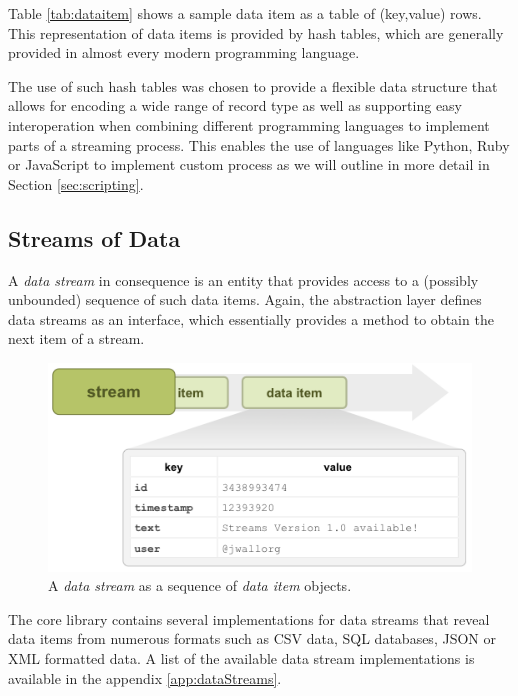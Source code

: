 Table \ref{tab:dataitem} shows a sample data item as a table of
(key,value) rows. This representation of data items is provided
by hash tables, which are generally provided in almost every modern
programming language.

The use of such hash tables was chosen to provide a flexible data
structure that allows for encoding a wide range of record type as well
as supporting easy interoperation when combining different programming
languages to implement parts of a streaming process. This enables the
use of languages like Python, Ruby or JavaScript to implement custom
process as we will outline in more detail in Section
\ref{sec:scripting}.

\subsection*{Streams of Data}
A {\em data stream} in consequence is an entity that provides access
to a (possibly unbounded) sequence of such data items. Again, the
\streams abstraction layer defines data streams as an interface, which
essentially provides a method to obtain the next item of a stream.

\begin{figure}[h1]
  \begin{center}
    \includegraphics[scale=0.5]{graphics/stream-items.png}
  \end{center}
  \caption{\label{fig:datastream}A {\em data stream} as a sequence of {\em data item} objects.}
\end{figure}

The core \streams library contains several implementations for data
streams that reveal data items from numerous formats such as CSV data,
SQL databases, JSON or XML formatted data. A list of the available
data stream implementations is available in the appendix \ref{app:dataStreams}.

